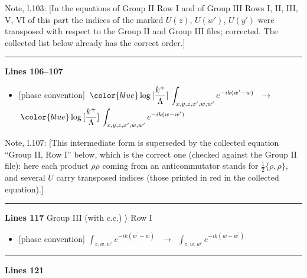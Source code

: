 \documentclass[10pt]{article}
\newenvironment{notebox}{\def\FrameCommand{{\color{notebar}\vrule width 1.5pt}\hspace{6pt}}\MakeFramed{\advance\hsize-\width\FrameRestore}\small}{\endMakeFramed}
\begin{document}
\begin{notebox}\textsf{\small Note, l.103:} [In the equations of Group II Row I and of Group III Rows I, II, III, V, VI of this part the indices of the marked $U(z)$, $U(w')$, $U(y')$ were transposed with respect to the Group II and Group III files; corrected. The collected list below already has the correct order.]\end{notebox}
\noindent\rule{\linewidth}{0.3pt}\par\noindent\textbf{Lines 106--107} \par
\begin{itemize}[leftmargin=2.2em,itemsep=1pt,topsep=2pt]
\item[\textbf{l.106}] \textsf{\small [phase convention]} $\displaystyle \,{\color{blue}\log{[\frac{k^{+}}{\Lambda}]}}\, \int_{x,y,z,x^{\prime},w,w^{\prime}}e^{-ik(w^{\prime}-w)}\,$\ $\longrightarrow$\ $\displaystyle \,{\color{blue}\log{[\frac{k^{+}}{\Lambda}]}}\, \int_{x,y,z,x^{\prime},w,w^{\prime}}e^{-ik(w-w^{\prime})}\,$
\end{itemize}
\begin{notebox}\textsf{\small Note, l.107:} [This intermediate form is superseded by the collected equation ``Group II, Row I'' below, which is the correct one (checked against the Group II file): here each product $\rho\rho$ coming from an anticommutator stands for $\frac{1}{2}\{\rho,\rho\}$, and several $U$ carry transposed indices (those printed in red in the collected equation).]\end{notebox}
\noindent\rule{\linewidth}{0.3pt}\par\noindent\textbf{Lines 117} \quad \textsf{Group III (with c.c.) $\rangle$ Row I} \par
\begin{itemize}[leftmargin=2.2em,itemsep=1pt,topsep=2pt]
\item[\textbf{l.117}] \textsf{\small [phase convention]} $\displaystyle \int_{z,w,w^{\prime}} e^{-ik(w^{\prime}-w)}\,$\ $\longrightarrow$\ $\displaystyle \int_{z,w,w^{\prime}} e^{-ik(w-w^{\prime})}\,$
\end{itemize}
\noindent\rule{\linewidth}{0.3pt}\par\noindent\textbf{Lines 121} \par
\end{document}
